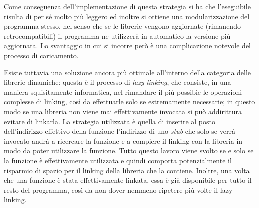 \documentclass[class=book, crop=false, oneside]{standalone}
\begin{document}
Come conseguenza dell'implementazione di questa strategia si ha che l'eseguibile risulta di per sé molto più leggero ed inoltre si ottiene una modularizzazione del programma stesso, nel senso che se le librerie vengono aggiornate (rimanendo retrocompatibili) il programma ne utilizzerà in automatico la versione più aggiornata. Lo svantaggio in cui si incorre però è una complicazione notevole del processo di caricamento.

Esiste tuttavia una soluzione ancora più ottimale all'interno della categoria delle librerie dinamiche: questa è il processo di \emph{lazy linking}, che consiste, in una maniera squisitamente informatica, nel rimandare il più possibie le operazioni complesse di linking, così da effettuarle solo se estremamente necessarie; in questo modo se una libreria non viene mai effettivamente invocata si può addirittura evitare di linkarla. La strategia utilizzata è quella di inserire al posto dell'indirizzo effettivo della funzione l'indirizzo di uno \emph{stub} che solo se verrà invocato andrà a ricercare la funzione e a compiere il linking con la libreria in modo da poter utilizzare la funzione. Tutto questo lavoro viene svolto se e solo se la funzione è effettivamente utilizzata e quindi comporta potenzialmente il risparmio di spazio per il linking della libreria che la contiene. Inoltre, una volta che una funzione è stata effettivamente linkata, essa è già disponibile per tutto il resto del programma, così da non dover nemmeno ripetere più volte il lazy linking.
\end{document}
